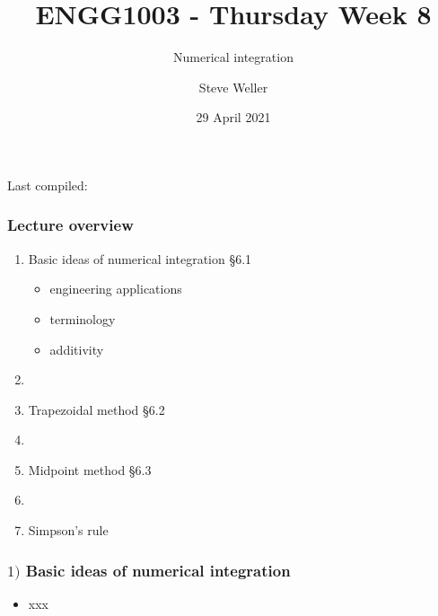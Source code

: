 \documentclass[english,14pt]{beamer}
\title{ENGG1003 - Thursday Week 8}
\subtitle{Numerical integration }%
\author{Steve Weller}
\institute{University of Newcastle}
\date{29 April 2021}
\newcommand\red[1]{{\color{red} #1}}
\begin{document}
\begin{flushleft}
{\scriptsize Last compiled:~\DTMnow}
\vspace*{-5mm}
\end{flushleft}
\framebreak


\begin{frame}[fragile]

\frametitle{Lecture overview}
\begin{enumerate}
	\item Basic ideas of numerical integration \red{\S6.1}
	\begin{itemize}
		\item engineering applications
		\item terminology
		\item additivity
	\end{itemize}
	
	\item[]
	
	\item Trapezoidal method \red{\S6.2}
	
	\item[]
	
	\item Midpoint method \red{\S6.3}
	
	\item[]
	
	\item Simpson's rule
	
\end{enumerate}

\end{frame}


\begin{frame}[fragile]

\frametitle{$1)$ Basic ideas of numerical integration}

\begin{itemize}
	\item xxx
\end{itemize}

\end{frame}

\end{document}
